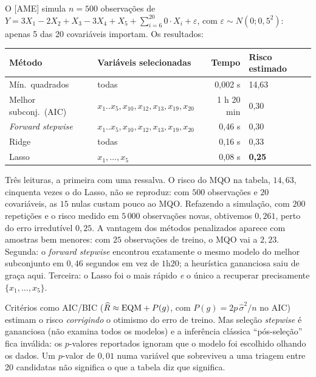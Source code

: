 \documentclass[11pt,a4paper]{article}
\begin{document}
\begin{exemplo}\label{ex:ame31}
O [AME] simula $n=500$ observações de
$Y = 3X_1-2X_2+X_3-3X_4+X_5+\sum_{i=6}^{20}0\cdot X_i+\varepsilon$, com
$\varepsilon\sim N(0;0{,}5^2)$: apenas 5 das 20 covariáveis importam. Os resultados:
\begin{center}\small
\renewcommand{\arraystretch}{1.2}
\begin{tabular}{@{}llrl@{}}
\toprule
\textbf{Método} & \textbf{Variáveis selecionadas} & \textbf{Tempo} & \textbf{Risco estimado} \\
\midrule
Mín.\ quadrados      & todas                    & 0,002 s & 14,63 \\
Melhor subconj.\ (AIC) & $x_1..x_5,x_{10},x_{12},x_{13},x_{19},x_{20}$ & 1 h 20 min & 0,30 \\
\emph{Forward stepwise}  & $x_1..x_5,x_{10},x_{12},x_{13},x_{19},x_{20}$ & 0,46 s & 0,30 \\
Ridge                & todas                    & 0,16 s & 0,33 \\
Lasso                & $x_1,\dots,x_5$          & 0,08 s & \textbf{0,25} \\
\bottomrule
\end{tabular}
\end{center}
Três leituras, a primeira com uma ressalva. O risco do MQO na tabela, $14{,}63$,
cinquenta vezes o do Lasso, não se reproduz: com $500$ observações e $20$
covariáveis, as $15$ nulas custam pouco ao MQO. Refazendo a simulação, com $200$
repetições e o risco medido em $5\,000$ observações novas, obtivemos $0{,}261$, perto
do erro irredutível $0{,}25$. A vantagem dos métodos penalizados aparece com amostras
bem menores: com $25$ observações de treino, o MQO vai a $2{,}23$. Segunda: o
\emph{forward stepwise} encontrou exatamente o mesmo modelo do melhor subconjunto
em $0{,}46$ segundos em vez de $1$h$20$; a heurística gananciosa saiu de graça aqui.
Terceira: o Lasso foi o mais rápido \emph{e} o único a recuperar precisamente
$\{x_1,\dots,x_5\}$.
\end{exemplo}

\begin{atencao}
Critérios como AIC/BIC ($\widehat{R} \approx \mathrm{EQM} + P(g)$, com
$P(g)=2p\,\widehat\sigma^2/n$ no AIC) estimam o risco \emph{corrigindo} o otimismo do
erro de treino. Mas seleção \emph{stepwise} é gananciosa (não examina todos os
modelos) e a inferência clássica ``pós-seleção'' fica inválida: os $p$-valores
reportados ignoram que o modelo foi escolhido olhando os dados. Um $p$-valor de
$0{,}01$ numa variável que sobreviveu a uma triagem entre 20 candidatas não
significa o que a tabela diz que significa.
\end{atencao}
\end{document}
